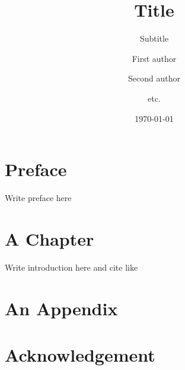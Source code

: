 \documentclass{msreport}
\institute{DTU Management Engineering}
\title{Title}
\subtitle{Subtitle} %
\date{\today}
\author{First author \and Second author \and etc.}
\begin{document}
	\maketitle
	
	\frontmatter
	
	\chapter*{Preface}
		Write preface here
	
	\tableofcontents
	
	\mainmatter
	\insertsummary
	
	\chapter{A Chapter}
	Write introduction here and cite like \cite{Simpson2016}
	
	
	
	
	\appendix
	\chapter{An Appendix}
	
	\chapter*{Acknowledgement}
	
\end{document}
